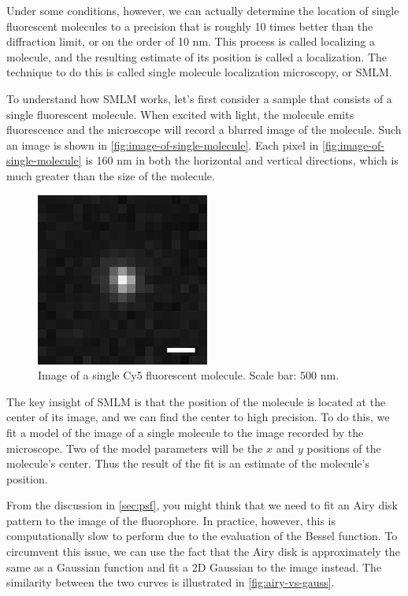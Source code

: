 \documentclass[10pt,a4paper]{book}
\begin{document}
Under some conditions, however, we can actually determine the location of single fluorescent molecules to a precision that is roughly 10 times better than the diffraction limit, or on the order of 10 nm. This process is called localizing a molecule, and the resulting estimate of its position is called a localization. The technique to do this is called single molecule localization microscopy, or SMLM.

To understand how SMLM works, let's first consider a sample that consists of a single fluorescent molecule. When excited with light, the molecule emits fluorescence and the microscope will record a blurred image of the molecule. Such an image is shown in \autoref{fig:image-of-single-molecule}. Each pixel in \autoref{fig:image-of-single-molecule} is 160 nm in both the horizontal and vertical directions, which is much greater than the size of the molecule.

\begin{figure}[ht]
    \centering
    \includegraphics{image-of-single-molecule.png}
    \caption{Image of a single Cy5 fluorescent molecule. Scale bar: 500 nm.}
    \label{fig:image-of-single-molecule}
\end{figure}

The key insight of SMLM is that the position of the molecule is located at the center of its image, and we can find the center to high precision. To do this, we fit a model of the image of a single molecule to the image recorded by the microscope. Two of the model parameters will be the $x$ and $y$ positions of the molecule's center. Thus the result of the fit is an estimate of the molecule's position.

From the discussion in \autoref{sec:psf}, you might think that we need to fit an Airy disk pattern to the image of the fluorophore. In practice, however, this is computationally slow to perform due to the evaluation of the Bessel function. To circumvent this issue, we can use the fact that the Airy disk is approximately the same as a Gaussian function and fit a 2D Gaussian to the image instead. The similarity between the two curves is illustrated in \autoref{fig:airy-vs-gauss}.
\end{document}
